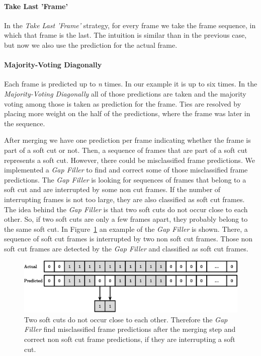 \paragraph{Take Last 'Frame'}
In the \textit{Take Last 'Frame'} strategy, for every frame we take the frame sequence, in which that frame is the last.
The intuition is similar than in the previous case, but now we also use the prediction for the actual frame.

\paragraph{Majority-Voting Diagonally}
Each frame is predicted up to \textit{n} times.
In our example it is up to six times.
In the \textit{Majority-Voting Diagonally} all of those predictions are taken and the majority voting among those is taken as prediction for the frame.
Ties are resolved by placing more weight on the half of the predictions, where the frame was later in the sequence.

After merging we have one prediction per frame indicating whether the frame is part of a soft cut or not.
Then, a sequence of frames that are part of a soft cut represents a soft cut.
However, there could be misclassified frame predictions.
We implemented a \textit{Gap Filler} to find and correct some of those misclassified frame predictions.
The \textit{Gap Filler} is looking for sequences of frames that belong to a soft cut and are interrupted by some non cut frames.
If the number of interrupting frames is not too large, they are also classified as soft cut frames.
The idea behind the \textit{Gap Filler} is that two soft cuts do not occur close to each other.
So, if two soft cuts are only a few frames apart, they probably belong to the same soft cut.
In Figure~\ref{fig:gap_filler} an example of the \textit{Gap Filler} is shown.
There, a sequence of soft cut frames is interrupted by two non soft cut frames.
Those non soft cut frames are detected by the \textit{Gap Filler} and classified as soft cut frames.
\begin{figure}[!htb]
	\centering
	\includegraphics[scale=.7]{images/gap_filler.eps}
	\caption{Two soft cuts do not occur close to each other. Therefore the \textit{Gap Filler} find misclassified frame predictions after the merging step and correct non soft cut frame predictions, if they are interrupting a soft cut.}
	\label{fig:gap_filler}
\end{figure}

